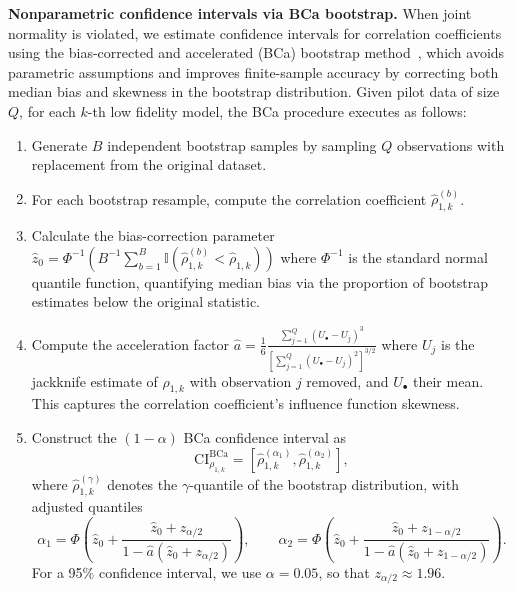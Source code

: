 \noindent \textbf{Nonparametric confidence intervals via BCa bootstrap.}
When joint normality is violated, we estimate confidence intervals for correlation coefficients using the bias-corrected and accelerated (BCa) bootstrap method~\cite{Ef:1987}, which avoids parametric assumptions and improves finite-sample accuracy by correcting both median bias and skewness in the bootstrap distribution. Given pilot data of size $Q$, for each $k$-th low fidelity model, the BCa procedure executes as follows:
%
\begin{enumerate}
    \item Generate $B$ independent bootstrap samples by sampling $Q$ observations with replacement from the original dataset.
    
    \item For each bootstrap resample, compute the correlation coefficient $\widehat{\rho}_{1,k}^{(b)}$.
    
    \item Calculate the bias-correction parameter $\widehat{z}_0 = \Phi^{-1}\left( B^{-1} \sum_{b=1}^B \mathbb{I}(\widehat{\rho}_{1,k}^{(b)} < \widehat{\rho}_{1,k}) \right)$ where $\Phi^{-1}$ is the standard normal quantile function, quantifying median bias via the proportion of bootstrap estimates below the original statistic.
    
    \item Compute the acceleration factor $\widehat{a} = \frac{1}{6} \frac{\sum_{j=1}^Q (U_\bullet - U_j)^3}{\left[ \sum_{j=1}^Q (U_\bullet - U_j)^2 \right]^{3/2}}$ where $U_j$ is the jackknife estimate of $\rho_{1,k}$ with observation $j$ removed, and $U_\bullet$ their mean. This captures the correlation coefficient's influence function skewness.
    
    \item Construct the $(1-\alpha)$ BCa confidence interval as
    \begin{equation}\label{eq:Confidence_Interval_bootstrap}
        \text{CI}_{\rho_{1,k}}^{\text{BCa}} = \left[ \widehat{\rho}_{1,k}^{(\alpha_1)}, \widehat{\rho}_{1,k}^{(\alpha_2)} \right],
    \end{equation}
    where $\widehat{\rho}_{1,k}^{(\gamma)}$ denotes the $\gamma$-quantile of the bootstrap distribution, with adjusted quantiles 
    \begin{equation*}
        \alpha_1 = \Phi\left( \widehat{z}_0 + \frac{\widehat{z}_0 + z_{\alpha/2}}{1 - \widehat{a}(\widehat{z}_0 + z_{\alpha/2})} \right),\qquad
        \alpha_2 = \Phi\left( \widehat{z}_0 + \frac{\widehat{z}_0 + z_{1-\alpha/2}}{1 - \widehat{a}(\widehat{z}_0 + z_{1-\alpha/2})} \right).
    \end{equation*}
    For a 95\% confidence interval, we use $\alpha = 0.05$, so that $z_{\alpha/2} \approx 1.96$.
\end{enumerate}
